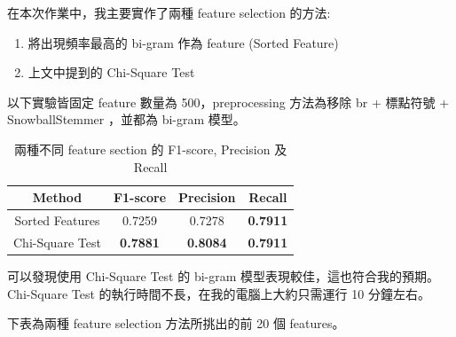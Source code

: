 \documentclass{article}[12pt]
\begin{document}
在本次作業中，我主要實作了兩種 feature selection 的方法:

\begin{enumerate}
    \item 將出現頻率最高的 bi-gram 作為 feature (Sorted Feature)
    \item 上文中提到的 Chi-Square Test
\end{enumerate}

以下實驗皆固定 feature 數量為 500，preprocessing 方法為移除 br + 標點符號 + SnowballStemmer
，並都為 bi-gram 模型。

\begin{table}[H]
    \centering
    \caption{兩種不同 feature section 的 F1-score, Precision 及 Recall}
    \begin{tabular}{@{}cccc@{}}
    \toprule
    Method          & F1-score        & Precision       & Recall          \\ \midrule
    Sorted Features & 0.7259          & 0.7278          & \textbf{0.7911} \\
    Chi-Square Test & \textbf{0.7881} & \textbf{0.8084} & \textbf{0.7911} \\ \bottomrule
    \end{tabular}
\end{table}

可以發現使用 Chi-Square Test 的 bi-gram 模型表現較佳，這也符合我的預期。
Chi-Square Test 的執行時間不長，在我的電腦上大約只需運行 10 分鐘左右。

下表為兩種 feature selection 方法所挑出的前 20 個 features。
\end{document}
